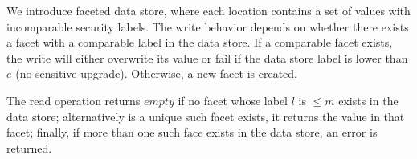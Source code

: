\begin{itemize}
\begin{itemize}
                We introduce faceted data store, where each location 
                contains a set of values with incomparable security 
                labels.  The write behavior depends on whether there 
                exists a facet with a comparable label in the data 
                store.  If a comparable facet exists, the write will 
                either overwrite its value or fail if the data store 
                label is lower than $e$ (no sensitive upgrade).  
                Otherwise, a new facet is created.  

                The read operation returns $empty$ if no facet whose 
                label $l$ is $\leq m$ exists in the data store; 
                alternatively is a unique such facet exists, it 
                returns the value in that facet; finally, if more than 
                one such face exists in the data store, an error is 
                returned.
        \end{itemize}
\end{itemize}